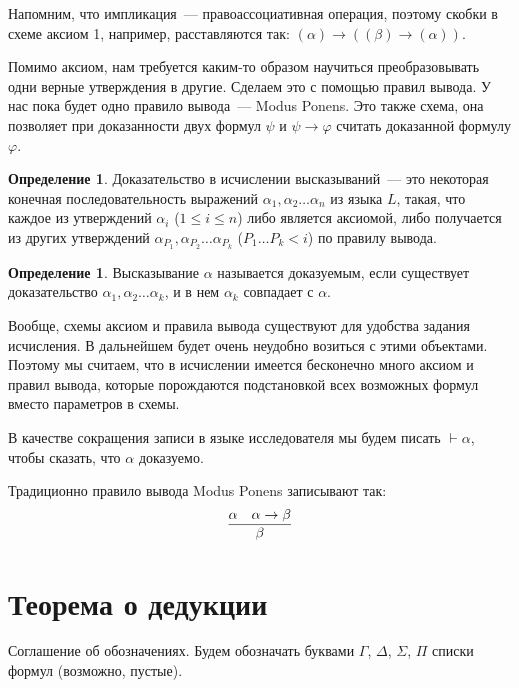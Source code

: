 \documentclass[a4paper,11pt]{article}
\theoremstyle{definition}
\newtheorem{dfn}[thm]{Определение}
\newcommand{\proves}{\vdash}
\begin{document}
Напомним, что импликация~--- правоассоциативная операция, поэтому скобки в
схеме аксиом 1, например, расставляются так: $(\alpha) \to ((\beta) \to (\alpha))$.

Помимо аксиом, нам требуется каким-то образом научиться преобразовывать одни
верные утверждения в другие. Сделаем это с помощью правил вывода. У нас пока
будет одно правило вывода~--- Modus Ponens. Это также схема, она позволяет при
доказанности двух формул $\psi$ и $\psi \to \varphi$ считать доказанной формулу
$\varphi$.

\begin{dfn}
Доказательство в исчислении высказываний~--- это некоторая конечная
последовательность выражений $\alpha_1, \alpha_2 \dots \alpha_n$ из языка $L$,
такая, что каждое из утверждений $\alpha_i$ ($1 \le i \le n$) либо является
аксиомой, либо получается из других утверждений
$\alpha_{P_1}, \alpha_{P_2} \dots \alpha_{P_k}$ ($P_1 \dots P_k < i$) по
правилу вывода.
\end{dfn}

\begin{dfn}
Высказывание $\alpha$ называется доказуемым, если существует доказательство
$\alpha_1, \alpha_2 \dots \alpha_k$, и в нем $\alpha_k$ совпадает с $\alpha$.
\end{dfn}

Вообще, схемы аксиом и правила вывода существуют для удобства задания
исчисления. В дальнейшем будет очень неудобно возиться с этими объектами.
Поэтому мы считаем, что в исчислении имеется бесконечно много аксиом и правил
вывода, которые порождаются подстановкой всех возможных формул вместо параметров
в схемы.

В качестве сокращения записи в языке исследователя мы будем писать
$\proves \alpha$, чтобы сказать, что $\alpha$ доказуемо.

Традиционно правило вывода Modus Ponens записывают так:
\[ \infer{\beta}{\alpha & \alpha \to \beta} \]

\section{Теорема о дедукции}
Соглашение об обозначениях. Будем обозначать буквами $\Gamma$, $\Delta$,
$\Sigma$, $\Pi$ списки формул (возможно, пустые).
\end{document}
